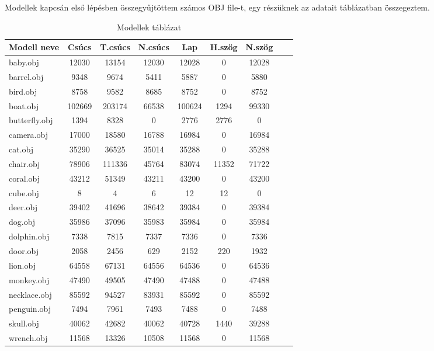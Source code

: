 
Modellek kapcsán első lépésben összegyűjtöttem számos OBJ file-t, egy részüknek az adatait  táblázatban összegeztem.

\begin{table}[h]
\centering
\caption{Modellek táblázat}
\bigskip
\label{tab:modellek}
\begin{tabular}{|l|c|c|c|c|c|c|c|c|}
Modell neve& Csúcs & T.csúcs & N.csúcs & Lap & H.szög & N.szög \\
\hline
baby.obj & 12030 & 13154 & 12030 & 12028 & 0 & 12028 \\
barrel.obj & 9348 & 9674 & 5411 & 5887 & 0 & 5880	\\
bird.obj & 8758 & 9582 & 8685 & 8752 & 0 & 8752 \\
boat.obj & 102669 & 203174 & 66538 & 100624 & 1294 & 99330\\
butterfly.obj & 1394 &	8328 &	0 & 2776 &	2776 &	0 \\
camera.obj & 17000 & 18580 & 16788 & 16984 & 0 & 16984 \\
cat.obj & 35290 & 36525 & 35014 & 35288 & 0 &	35288 \\
chair.obj & 78906 & 111336 & 45764 & 83074 & 11352 & 71722 \\
coral.obj & 43212 & 51349 & 43211 & 43200 & 0 & 43200 \\
cube.obj & 8 & 4 & 6 & 12 & 12 & 0 \\
deer.obj & 39402 & 41696 & 38642 & 39384 & 0 & 39384 \\
dog.obj & 35986 & 37096 & 35983 & 35984 & 0 & 35984 \\
dolphin.obj & 7338 & 7815 & 7337 & 7336 & 0 & 7336 \\
door.obj & 2058 & 2456 & 629 & 2152 &	220 & 1932 \\
lion.obj & 64558 & 67131 & 64556 & 64536 & 0 & 64536 \\
monkey.obj & 47490 & 49505 & 47490 & 47488 & 0 & 47488 \\
necklace.obj & 85592 &	94527 & 83931 & 85592 & 0 & 85592 \\
penguin.obj & 7494 & 7961 & 7493 & 7488 & 0 & 7488 \\
skull.obj & 40062 & 42682 & 40062 & 40728 & 1440 & 39288 \\
wrench.obj & 11568 & 13326 & 10508 & 11568 & 0 & 11568 \\
\hline
\end{tabular}
\label{fig:modellekt}
\end{table}

